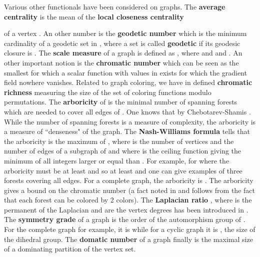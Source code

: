 \documentclass[12pt]{amsart}
\theoremstyle{definition}
\begin{document}
Various other functionals have been considered on graphs. The {\bf average centrality} 
is the mean of the {\bf local closeness centrality}

of a vertex . An other number is the {\bf geodetic number}  which is the minimum
cardinality of a geodetic set in , where a set is called {\bf geodetic} if its geodesic closure
is  \cite{BKT}. The {\bf scale measure} of a graph is defined as , where 
 and  and .  
An other important notion is the {\bf chromatic number}  which can be seen as the smallest
 for which a scalar function with values in  exists for which the gradient 
field  nowhere vanishes. Related to graph coloring, we have in \cite{colorcurvature} defined 
{\bf chromatic richness}  measuring the size of the set of coloring functions modulo permutations.
The {\bf arboricity}  of  is the minimal number of spanning forests 
which are needed to cover all edges of . One knows that  by 
Chebotarev-Shamis \cite{ChebotarevShamis2,ChebotarevShamis1,Knillforest,CauchyBinetKnill}.
While the number of spanning forests is a measure of complexity, the arboricity is a measure of 
``denseness" of the graph. The {\bf Nash-Williams formula} \cite{NashWilliams,CMWZZ} 
tells that the arboricity is the maximum of , where 
is the number of vertices and  the number of edges of a subgraph  of  and where  is
the ceiling function giving the minimum of all integers larger or equal than . For example, 
for  where  the arboricity must be at least  and so at least  
and one can give examples of three forests covering all edges. 
For a complete graph, the arboricity is . The arboricity gives a bound on 
the chromatic number  (a fact noted in \cite{ButlerArboricity} and follows 
from the fact that each forest can be colored by 2 colors). 
The {\bf Laplacian ratio} , 
where  is the 
permanent of the Laplacian and  are the vertex degrees has been introduced in \cite{BrualdiGoldwasser}.
The {\bf symmetry grade} of a graph is the order of the automorphism group of . For the complete graph 
for example, it is  while for a cyclic graph it is , the size of the dihedral group. 
The {\bf domatic number}  of a graph finally is the maximal size of a dominating partition of 
the vertex set.  \\
\end{document}
